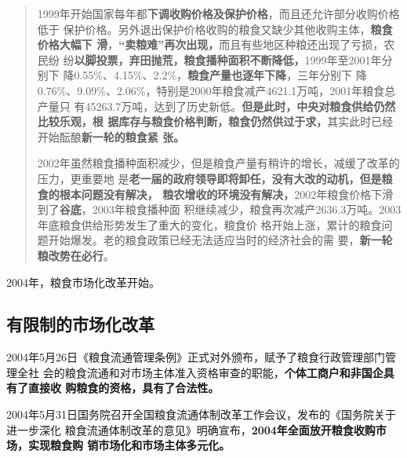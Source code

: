 \begin{quotation}
  1999年开始国家每年都\textbf{下调收购价格及保护价格}，而且还允许部分收购价格低于
  保护价格。另外退出保护价格收购的粮食又缺少其他收购主体，\textbf{粮食价格大幅下
    滑}，\textbf{“卖粮难”再次出现，}而且有些地区种粮还出现了亏损，农民纷
  纷\textbf{以脚投票，弃田抛荒，粮食播种面积不断降低，}1999年至2001年分别下
  降0.55\%、4.15\%、2.2\%，\textbf{粮食产量也逐年下降}，三年分别下
  降0.76\%、9.09\%、2.06\%，特别是2000年粮食减产4621.1万吨，2001年粮食总产量只
  有45263.7万吨，达到了历史新低。\textbf{但是此时，中央对粮食供给仍然比较乐观，根
    据库存与粮食价格判断，粮食仍然供过于求，}其实此时已经开始酝酿\textbf{新一轮的粮食紧
    张。}

  2002年虽然粮食播种面积减少，但是粮食产量有稍许的增长，减缓了改革的压力，更重要地
  是\textbf{老一届的政府领导即将卸任，没有大改的动机，但是粮食的根本问题没有解决，
    粮农增收的环境没有解决，}2002年粮食价格下滑到了\textbf{谷底}，2003年粮食播种面
  积继续减少，粮食再次减产2636.3万吨。2003年底粮食供给形势发生了重大的变化，粮食价
  格开始上涨，累计的粮食问题开始爆发。老的粮食政策已经无法适应当时的经济社会的需
  要，\textbf{新一轮粮改势在必行}。
\end{quotation}

2004年，粮食市场化改革开始。

\subsection{有限制的市场化改革}


2004年5月26日《粮食流通管理条例》正式对外颁布，赋予了粮食行政管理部门管理全社
会的粮食流通和对市场主体准入资格审查的职能，\textbf{个体工商户和非国企具有了直接收
  购粮食的资格，具有了合法性。}

2004年5月31日国务院召开全国粮食流通体制改革工作会议，发布的《国务院关于进一步深化
粮食流通体制改革的意见》明确宣布，\textbf{2004年全面放开粮食收购市场，实现粮食购
  销市场化和市场主体多元化。}

